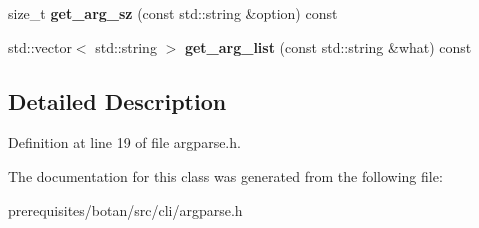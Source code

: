 \begin{DoxyCompactItemize}
\item 
\mbox{\label{class_botan___c_l_i_1_1_argument___parser_aacc5c8f117632c68ade98679a7ef9aa5}} 
size\+\_\+t {\bfseries get\+\_\+arg\+\_\+sz} (const std\+::string \&option) const
\item 
\mbox{\label{class_botan___c_l_i_1_1_argument___parser_ae0810b35298b2392ee401fbe3675d14d}} 
std\+::vector$<$ std\+::string $>$ {\bfseries get\+\_\+arg\+\_\+list} (const std\+::string \&what) const
\end{DoxyCompactItemize}


\subsection{Detailed Description}


Definition at line 19 of file argparse.\+h.



The documentation for this class was generated from the following file\+:\begin{DoxyCompactItemize}
\item 
prerequisites/botan/src/cli/argparse.\+h\end{DoxyCompactItemize}
